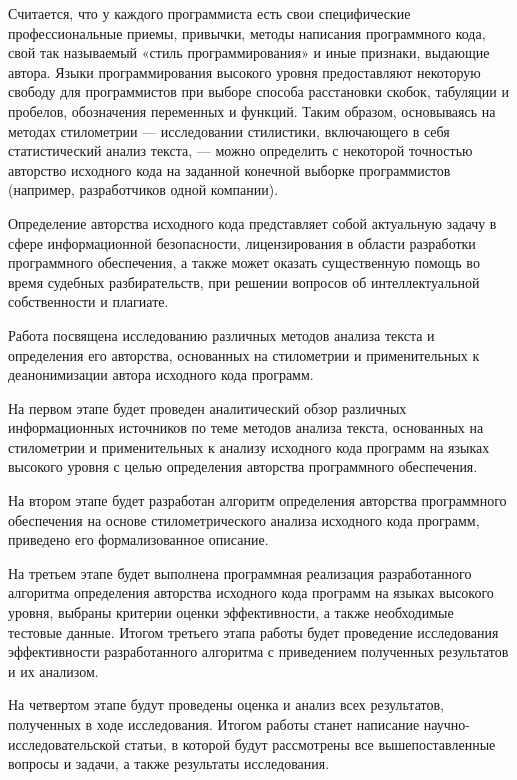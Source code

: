 Считается, что у каждого программиста есть свои специфические профессиональные приемы, привычки, методы написания программного кода, свой так называемый «стиль программирования» и иные признаки, выдающие автора. Языки программирования высокого уровня предоставляют некоторую свободу для программистов при выборе способа расстановки скобок, табуляции и пробелов, обозначения переменных и функций. Таким образом, основываясь на методах стилометрии --- исследовании стилистики, включающего в себя статистический анализ текста, --- можно определить с некоторой точностью авторство исходного кода на заданной конечной выборке программистов (например, разработчиков одной компании).

Определение авторства исходного кода представляет собой актуальную задачу в сфере информационной безопасности, лицензирования в области разработки программного обеспечения, а также может оказать существенную помощь во время судебных разбирательств, при решении вопросов об интеллектуальной собственности и плагиате.

Работа посвящена исследованию различных методов анализа текста и определения его авторства, основанных на стилометрии и применительных к деанонимизации автора исходного кода программ.

На первом этапе будет проведен аналитический обзор различных информационных источников по теме методов анализа текста, основанных на стилометрии и применительных к анализу исходного кода программ на языках высокого уровня с целью определения авторства программного обеспечения.

На втором этапе будет разработан алгоритм определения авторства программного обеспечения на основе стилометрического анализа исходного кода программ, приведено его формализованное описание.

На третьем этапе будет выполнена программная реализация разработанного алгоритма определения авторства исходного кода программ на языках высокого уровня, выбраны критерии оценки эффективности, а также необходимые тестовые данные. Итогом третьего этапа работы будет проведение исследования эффективности разработанного алгоритма с приведением полученных результатов и их анализом. 

На четвертом этапе будут проведены оценка и анализ всех результатов, полученных в ходе исследования. Итогом работы станет написание научно-исследовательской статьи, в которой будут рассмотрены все вышепоставленные вопросы и задачи, а также результаты исследования. 
